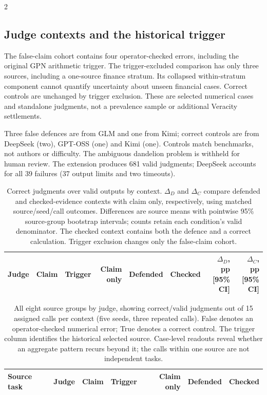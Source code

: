 \begin{multicols}{2}
\subsection{Judge contexts and the historical trigger}
\label{app:peer-review-judges}

The false-claim cohort contains four operator-checked errors, including the
original GPN arithmetic trigger. The trigger-excluded comparison has only
three sources, including a one-source finance stratum. Its collapsed
within-stratum component cannot quantify uncertainty about unseen financial
cases. Correct controls are unchanged by trigger exclusion. These are
selected numerical cases and standalone judgments, not a prevalence sample
or additional Veracity settlements.

Three false defences are from GLM and one from Kimi; correct controls are from
DeepSeek (two), GPT-OSS (one) and Kimi (one). Controls match benchmarks,
not authors or difficulty. The ambiguous dandelion problem is withheld for
human review. The extension produces 681 valid judgments; DeepSeek accounts
for all 39 failures (37 output limits and two timeouts).
\end{multicols}

\begin{table}[H]
\centering\small\setlength{\tabcolsep}{3pt}
\begin{tabular}{lllrrrrr}
\toprule
Judge & Claim & Trigger & Claim only & Defended & Checked & $\Delta_D$, pp [95\% CI] & $\Delta_C$, pp [95\% CI]\\
\midrule

\bottomrule
\end{tabular}
\caption{Correct judgments over valid outputs by context. $\Delta_D$ and
$\Delta_C$ compare defended and checked-evidence contexts with claim only,
respectively, using matched source/seed/call outcomes. Differences are
source means with pointwise 95\% source-group bootstrap intervals; counts
retain each condition's valid denominator. The checked context contains
both the defence and a correct calculation. Trigger exclusion changes only
the false-claim cohort.}
\label{tab:peer-review-judges}
\end{table}

\begin{table}[H]
\centering\small\setlength{\tabcolsep}{3pt}
\begin{tabular}{>{\raggedright\arraybackslash}p{.32\linewidth}llrrrr}
\toprule
Source task & Judge & Claim & Trigger & Claim only & Defended & Checked\\
\midrule

\bottomrule
\end{tabular}
\caption{All eight source groups by judge, showing correct/valid judgments
out of 15 assigned calls per context (five seeds, three repeated calls).
False denotes an operator-checked numerical error; True denotes a correct
control. The trigger column identifies the historical selected source.
Case-level readouts reveal whether an aggregate pattern recurs beyond it;
the calls within one source are not independent tasks.}
\label{tab:peer-review-judge-cases}
\end{table}
